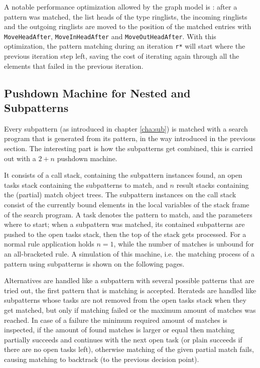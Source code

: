 A notable performance optimization allowed by the graph model is : after a pattern was matched, the list heads of the type ringlists, the incoming ringlists and the outgoing ringlists are moved to the position of the matched entries with \texttt{MoveHeadAfter}, \texttt{MoveInHeadAfter} and \texttt{MoveOutHeadAfter}.
With this optimization, the pattern matching during an iteration \texttt{r*} will start where the previous iteration step left, saving the cost of iterating again through all the elements that failed in the previous iteration.

\subsection*{Pushdown Machine for Nested and Subpatterns}\label{pushdownmachine}
Every subpattern (as introduced in chapter \ref{cha:sub}) is matched with a search program that is generated from its pattern, in the way introduced in the previous section. 
The interesting part is how the subpatterns get combined, this is carried out with a $2+n$ pushdown machine.

It consists of a call stack, containing the subpattern instances found, an open tasks stack containing the subpatterns to match, and $n$ result stacks containing the (partial) match object trees.
The subpattern instances on the call stack consist of the currently bound elements in the local variables of the stack frame of the search program.
A task denotes the pattern to match, and the parameters where to start; when a subpattern was matched, its contained subpatterns are pushed to the open tasks stack, then the top of the stack gets processed.
For a normal rule application holds $n=1$, while the number of matches is unbound for an all-bracketed rule.
A simulation of this machine, i.e. the matching process of a pattern using subpatterns is shown on the following pages.

Alternatives are handled like a subpattern with several possible patterns that are tried out, the first pattern that is matching is accepted.
Iterateds are handled like subpatterns whose tasks are not removed from the open tasks stack when they get matched, but only if matching failed or the maximum amount of matches was reached.
In case of a failure the minimum required amount of matches is inspected, if the amount of found matches is larger or equal then matching partially succeeds and continues with the next open task (or plain succeeds if there are no open tasks left), otherwise matching of the given partial match fails, causing matching to backtrack (to the previous decision point).

